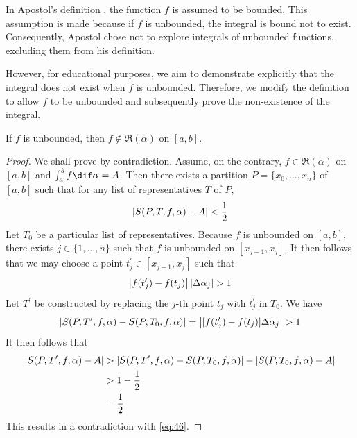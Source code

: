 \documentclass[thmcnt=section, color=blue, 12pt]{my-elegantbook}
\begin{document}
In Apostol's definition \cite{apostolMathematicalAnalysisModern1974},
the function $f$ is assumed to be bounded.
This assumption is made because if $f$ is unbounded,
the integral is bound not to exist.
Consequently, Apostol chose not to explore integrals of unbounded functions,
excluding them from his definition.

However, for educational purposes,
we aim to demonstrate explicitly that
the integral does not exist when $f$ is unbounded.
Therefore, we modify the definition to allow $f$
to be unbounded and subsequently prove the non-existence of the integral.

\begin{proposition}
	If $f$ is unbounded, then $f \notin \mathfrak{R}(\alpha)$ on $[a, b]$.
\end{proposition}

\begin{proof}
	We shall prove by contradiction.
	Assume, on the contrary, $f \in \mathfrak{R}(\alpha)$ on $[a, b]$
	and $\int_a^b f \dif \alpha = A$.
	Then there exists a partition $P = \{x_0, \ldots, x_n\}$ of $[a, b]$ such that
	for any list of representatives $T$ of $P$,
	\begin{align}
		\left\lvert S(P, T, f, \alpha) - A \right\rvert < \frac{1}{2}
		\label{eq:46}
	\end{align}
	Let $T_0$ be a particular list of representatives.
	Because $f$ is unbounded on $[a, b]$,
	there exists $j \in \{1, \ldots, n\}$
	such that $f$ is unbounded on $[x_{j-1}, x_j]$.
	It then follows that we may choose a
	point $t_j^\prime \in [x_{j-1}, x_j]$
	such that
	\begin{align*}
		\left\lvert f(t_j^\prime) - f(t_j) \right\rvert \left\lvert \Delta \alpha_j \right\rvert > 1
	\end{align*}
	Let $T^\prime$ be constructed by replacing
	the $j$-th point $t_j$ with $t_j^\prime$ in $T_0$.
	We have
	\begin{align*}
		\left\lvert S(P, T^\prime, f, \alpha) - S(P, T_0, f, \alpha) \right\rvert
		= \left\lvert  [ f(t_j^\prime) - f(t_j) ] \Delta \alpha_j \right\rvert
		> 1
	\end{align*}
	It then follows that
	\begin{align*}
		\left\lvert S(P, T^\prime, f, \alpha) - A \right\rvert
		 & > \left\lvert S(P, T^\prime, f, \alpha) - S(P, T_0, f, \alpha) \right\rvert
		- 	\left\lvert S(P, T_0, f, \alpha) - A \right\rvert                           \\
		 & > 1 - \frac{1}{2}                                        \\
		 & = \frac{1}{2}
	\end{align*}
	This results in a contradiction with \eqref{eq:46}.
\end{proof}
\end{document}
